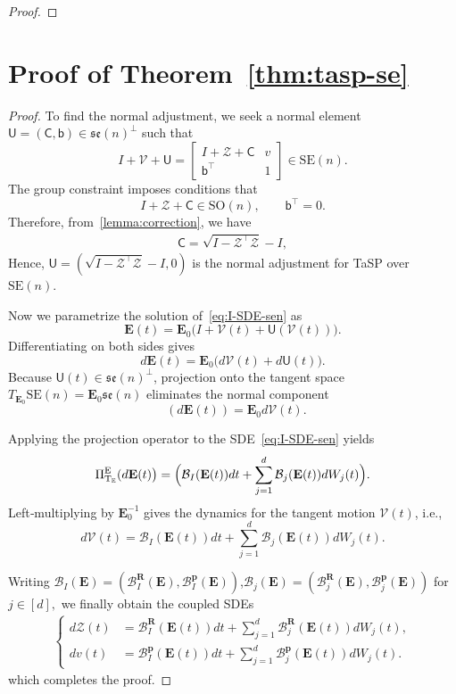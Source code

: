 \documentclass[11pt, a4paper, onecolumn]{article}
\newcommand{\SOn}{\mathrm{SO}(n)}
\newcommand{\SEn}{\mathrm{SE}(n)}
\newcommand{\sen}{\mathfrak{se}(n)}
\newcommand{\senp}{\mathfrak{se}(n)^{\perp}}
\newcommand{\E}{\mathbb{E}}
\newcommand{\bfE}{\bf{E}}
\newcommand{\bfR}{\mathbf{R}}
\newcommand{\B}{\mathcal{B}}
\renewcommand{\bf}[1]{\mathbf{#1}}
\newcommand{\tg}[1]{\mathcal{#1}}
\newcommand{\nm}[1]{\mathsf{#1}}
\DeclareMathOperator{\PEtg}{\Pi^E_{T_{\E}}}
\begin{document}
\begin{appendices}
\begin{proof}
\end{proof}

\section{Proof of Theorem~\ref{thm:tasp-se}}\label{app:tasp-se} 
\begin{proof}

To find the normal adjustment, we seek a normal element
$
\nm U=(\nm C,\nm b)\in\senp
$
such that 
\[
I+\tg V+\nm U
=
\begin{bmatrix}
I+\tg Z+\nm C & v\\
\nm b^{\top} & 1
\end{bmatrix}\in \SEn.
\]
The group constraint imposes conditions that
\[
I+\tg Z+\nm C\in\SOn,
\qquad
\nm b^{\top}=0 .
\]
Therefore, from~\cref{lemma:correction}, we have
\begin{align}
    \nm C
=
\sqrt{I-\tg Z^{\top}\tg Z}-I,
\end{align}
Hence,
$
\nm U=(\sqrt{I-\tg Z^{\top}\tg Z}-I,0)
$
is the normal adjustment for TaSP over $\SEn$.


Now we parametrize the solution of~\eqref{eq:I-SDE-sen} as
\[
\bfE(t)
=
\bfE_0\bigl(I+\tg V(t)+\nm U(\tg V(t))\bigr).
\]
Differentiating on both sides gives
\[
d\bfE(t) = \bfE_0\bigl(d\tg V(t)+d\nm U(t)\bigr).
\]
Because $\nm U(t)\in\senp$, projection onto the tangent space
$T_{\bfE_0}\SEn=\bfE_0\sen$ eliminates the normal component
\[
\PEtg (d\bfE(t)) = \bfE_0d\tg V(t).
\]

Applying the projection operator to the SDE~\eqref{eq:I-SDE-sen} yields
\[
\PEtg(d\bfE(t)\bigr) = \Bigl( \B_I(\bfE(t))dt + \sum_{j=1}^{d}\B_j(\bfE(t))dW_j(t) \Bigr).
\]
Left‐multiplying by $\bfE_0^{-1}$ gives the dynamics for the tangent motion $ \tg V(t) $, i.e.,
\[
d\tg V(t)
=
\B_I(\bfE(t))dt
+
\sum_{j=1}^{d}\B_j(\bfE(t))dW_j(t).
\]

Writing $\B_I(\bfE)=(\B_I^{\bfR}(\bfE),\B_I^{\bf p}(\bfE))$,$\B_j(\bfE)=(\B_j^{\bfR}(\bfE),\B_j^{\bf p}(\bfE))$ for $ j \in [d],$
we finally obtain the coupled SDEs
\begin{align*}
\begin{cases}
    d\tg Z(t) &= \B_I^{\bfR}(\bfE(t))dt+\sum_{j=1}^{d}\B_j^{\bfR}(\bfE(t))dW_j(t),\\
    dv(t) &= \B_I^{\bf p}(\bfE(t))dt+\sum_{j=1}^{d}\B_j^{\bf p}(\bfE(t))dW_j(t).
\end{cases}
\end{align*}
which completes the proof. 





\end{proof}
\end{appendices}
\end{document}
